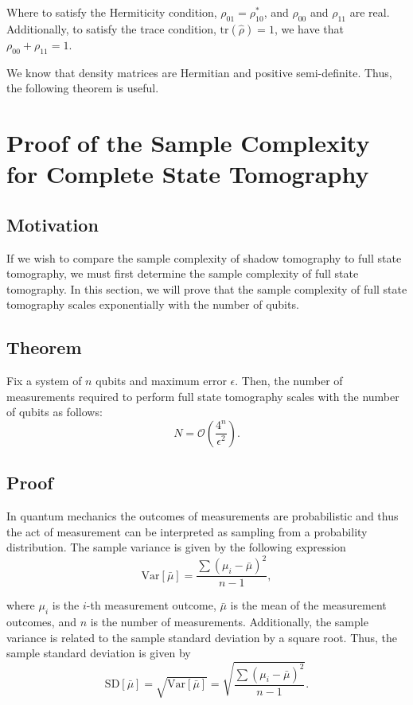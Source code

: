 \documentclass[12pt]{article}
\begin{document}
    Where to satisfy the Hermiticity condition, $\rho_{01} = \rho_{10}^*$, and $\rho_{00}$ and $\rho_{11}$ are real. Additionally, to satisfy the trace condition, $\text{tr}(\hat{\rho}) = 1$, we have that $\rho_{00} + \rho_{11} = 1$. 
    
    We know that density matrices are Hermitian and positive semi-definite. Thus, the following theorem is useful.
    \begin{theorem}
        
    \end{theorem}

    \section{Proof of the Sample Complexity for Complete State Tomography}
    \subsection{Motivation}
    If we wish to compare the sample complexity of shadow tomography to full state tomography, we must first determine the sample complexity of full state tomography. In this section, we will prove that the sample complexity of full state tomography scales exponentially with the number of qubits.

    \subsection{Theorem}
    Fix a system of $n$ qubits and maximum error $\epsilon$. Then, the number of measurements required to perform full state tomography scales with the number of qubits as follows:
    \begin{equation*}
        N = \mathcal{O}\left(\frac{4^n}{\epsilon^2}\right).
    \end{equation*}

    \subsection{Proof}
    In quantum mechanics the outcomes of measurements are probabilistic and thus the act of measurement can be interpreted as sampling from a probability distribution. The sample variance is given by the following expression
    \begin{equation}
        \text{Var}[\bar{\mu}] = \frac{\sum (\mu_i - \bar{\mu})^2}{n-1},
    \end{equation}

    where $\mu_i$ is the $i$-th measurement outcome, $\bar{\mu}$ is the mean of the measurement outcomes, and $n$ is the number of measurements. Additionally, the sample variance is related to the sample standard deviation by a square root. Thus, the sample standard deviation is given by
    \begin{equation}
        \text{SD}[\bar{\mu}] = \sqrt{\text{Var}[\bar{\mu}]} = \sqrt{\frac{\sum (\mu_i - \bar{\mu})^2}{n-1}}.
    \end{equation}
\end{document}
